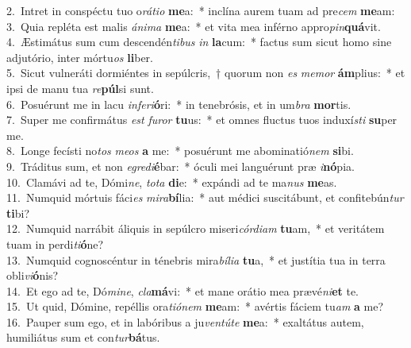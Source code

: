 {2.~}Intret in conspéctu tuo o\textit{rá}\textit{ti}\textit{o} \textbf{me}a:~* inclína aurem tuam ad pre\textit{cem} \textbf{me}am:\\
{3.~}Quia repléta est malis \textit{á}\textit{ni}\textit{ma} \textbf{me}a:~* et vita mea inférno appro\textit{pin}\textbf{quá}vit.\\
{4.~}Æstimátus sum cum descendén\textit{ti}\textit{bus} \textit{in} \textbf{la}cum:~* factus sum sicut homo sine adjutório, inter mórtu\textit{os} \textbf{li}ber.\\
{5.~}Sicut vulneráti dormiéntes in sepúlcris,~† quorum non \textit{es} \textit{me}\textit{mor} \textbf{ám}plius:~* et ipsi de manu tua \textit{re}\textbf{púl}si sunt.\\
{6.~}Posuérunt me in lacu \textit{in}\textit{fe}\textit{ri}\textbf{ó}ri:~* in tenebrósis, et in um\textit{bra} \textbf{mor}tis.\\
{7.~}Super me confirmátus \textit{est} \textit{fu}\textit{ror} \textbf{tu}us:~* et omnes fluctus tuos induxí\textit{sti} \textbf{su}per me.\\
{8.~}Longe fecísti no\textit{tos} \textit{me}\textit{os} \textbf{a} me:~* posuérunt me abominatió\textit{nem} \textbf{si}bi.\\
{9.~}Tráditus sum, et non \textit{e}\textit{gre}\textit{di}\textbf{é}bar:~* óculi mei languérunt præ \textit{i}\textbf{nó}pia.\\
{10.~}Clamávi ad te, Dómi\textit{ne}, \textit{to}\textit{ta} \textbf{di}e:~* expándi ad te ma\textit{nus} \textbf{me}as.\\
{11.~}Numquid mórtuis fáci\textit{es} \textit{mi}\textit{ra}\textbf{bí}lia:~* aut médici suscitábunt, et confitebún\textit{tur} \textbf{ti}bi?\\
{12.~}Numquid narrábit áliquis in sepúlcro miseri\textit{cór}\textit{di}\textit{am} \textbf{tu}am,~* et veritátem tuam in perdi\textit{ti}\textbf{ó}ne?\\
{13.~}Numquid cognoscéntur in ténebris mira\textit{bí}\textit{li}\textit{a} \textbf{tu}a,~* et justítia tua in terra obli\textit{vi}\textbf{ó}nis?\\
{14.~}Et ego ad te, Dó\textit{mi}\textit{ne}, \textit{cla}\textbf{má}vi:~* et mane orátio mea prævé\textit{ni}\textbf{et} te.\\
{15.~}Ut quid, Dómine, repéllis ora\textit{ti}\textit{ó}\textit{nem} \textbf{me}am:~* avértis fáciem tu\textit{am} \textbf{a} me?\\
{16.~}Pauper sum ego, et in labóribus a ju\textit{ven}\textit{tú}\textit{te} \textbf{me}a:~* exaltátus autem, humiliátus sum et con\textit{tur}\textbf{bá}tus.\\
